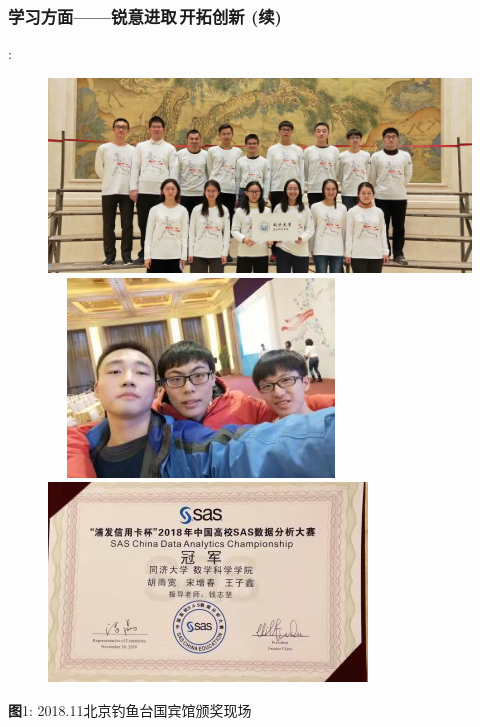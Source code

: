 \documentclass[10pt]{beamer}
\begin{document}
\begin{frame}
\frametitle{学习方面——锐意进取$\,$开拓创新 (续)}
{}:\\
{}
\begin{figure}\centering
\includegraphics[width=.35\paperwidth]{SAStogether.jpg}$\quad$
\includegraphics[width=.215\paperwidth]{SASphoto.jpg}\\\vspace{1em}
\includegraphics[width=.25\paperwidth]{SAScertificate.jpg}
\end{figure}
\begin{center}\footnotesize \textbf{图}1: 2018.11北京钓鱼台国宾馆颁奖现场\end{center}
\end{frame}
\end{document}
